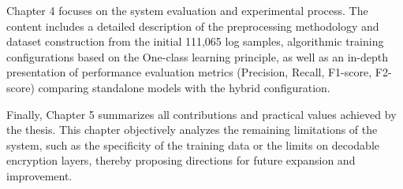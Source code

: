 \documentclass[../main.tex]{subfiles}
\begin{document}
Chapter 4 focuses on the system evaluation and experimental process. The content includes a detailed description of the preprocessing methodology and dataset construction from the initial 111,065 log samples, algorithmic training configurations based on the One-class learning principle, as well as an in-depth presentation of performance evaluation metrics (Precision, Recall, F1-score, F2-score) comparing standalone models with the hybrid configuration.

Finally, Chapter 5 summarizes all contributions and practical values achieved by the thesis. This chapter objectively analyzes the remaining limitations of the system, such as the specificity of the training data or the limits on decodable encryption layers, thereby proposing directions for future expansion and improvement.
\end{document}
